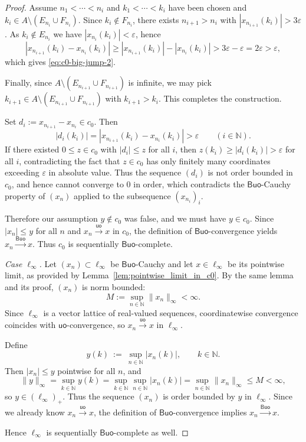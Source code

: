 \documentclass[11pt]{amsart}
\theoremstyle{definition}
\newcommand{\N}{\mathbb{N}}
\newcommand{\uo}{\ensuremath{\mathsf{uo}}}
\newcommand{\Buo}{\ensuremath{\mathsf{Buo}}}
\renewcommand{\le}{\leqslant}
\renewcommand{\ge}{\geqslant}
\begin{document}
\begin{proof}
Assume $n_1<\cdots<n_i$ and $k_1<\cdots<k_i$ have been chosen and
$k_i\in A\setminus(E_{n_i}\cup F_{n_i})$.
Since $k_i\notin F_{n_i}$, there exists $n_{i+1}>n_i$ with $|x_{n_{i+1}}(k_i)|>3\varepsilon$.
As $k_i\notin E_{n_i}$ we have $|x_{n_i}(k_i)|<\varepsilon$, hence
\[
|x_{n_{i+1}}(k_i)-x_{n_i}(k_i)|
\ge |x_{n_{i+1}}(k_i)|-|x_{n_i}(k_i)|
>3\varepsilon-\varepsilon=2\varepsilon>\varepsilon,
\]
which gives \eqref{eq:c0-big-jump-2}.

Finally, since $A\setminus(E_{n_{i+1}}\cup F_{n_{i+1}})$ is infinite, we may pick
$k_{i+1}\in A\setminus(E_{n_{i+1}}\cup F_{n_{i+1}})$ with $k_{i+1}>k_i$.
This completes the construction.

Set $d_i:=x_{n_{i+1}}-x_{n_i}\in c_0$.  Then
\[
|d_i(k_i)|=|x_{n_{i+1}}(k_i)-x_{n_i}(k_i)|>\varepsilon\qquad(i\in\N).
\]
If there existed $0\le z\in c_0$ with $|d_i|\le z$ for all $i$, then
$z(k_i)\ge |d_i(k_i)|>\varepsilon$ for all $i$, contradicting the fact that
$z\in c_0$ has only finitely many coordinates exceeding $\varepsilon$ in
absolute value.  Thus the sequence $(d_i)$ is not order bounded in $c_0$,
and hence cannot converge to $0$ in order, which contradicts the
\Buo-Cauchy property of $(x_n)$ applied to the subsequence $(x_{n_i})_i$.

Therefore our assumption $y\notin c_0$ was false, and we must have
$y\in c_0$.  Since $|x_n|\le y$ for all $n$ and $x_n\xrightarrow{\uo}x$ in
$c_0$, the definition of \Buo-convergence yields $x_n\xrightarrow{\Buo}x$.
Thus $c_0$ is sequentially \Buo-complete.

\medskip

\emph{Case $\ell_\infty$.}
Let $(x_n)\subset\ell_\infty$ be \Buo-Cauchy and let $x\in\ell_\infty$ be
its pointwise limit, as provided by Lemma~\ref{lem:pointwise_limit_in_c0}.
By the same lemma and its proof, $(x_n)$ is norm bounded:
\[
M:=\sup_{n\in\N}\|x_n\|_\infty<\infty.
\]
Since $\ell_\infty$ is a vector lattice of real-valued sequences,
coordinatewise convergence coincides with $\uo$-convergence, so
$x_n\xrightarrow{\uo}x$ in $\ell_\infty$.

Define
\[
y(k)\ :=\ \sup_{n\in\N}|x_n(k)|,\qquad k\in\N.
\]
Then $|x_n|\le y$ pointwise for all $n$, and
\[
\|y\|_\infty
=\sup_{k\in\N}y(k)
=\sup_{k\in\N}\sup_{n\in\N}|x_n(k)|
=\sup_{n\in\N}\|x_n\|_\infty
\le M<\infty,
\]
so $y\in(\ell_\infty)_+$.  Thus the sequence $(x_n)$ is order bounded by
$y$ in $\ell_\infty$.  Since we already know $x_n\xrightarrow{\uo}x$, the
definition of \Buo-convergence implies $x_n\xrightarrow{\Buo}x$.

Hence $\ell_\infty$ is sequentially \Buo-complete as well.
\end{proof}
\end{document}
